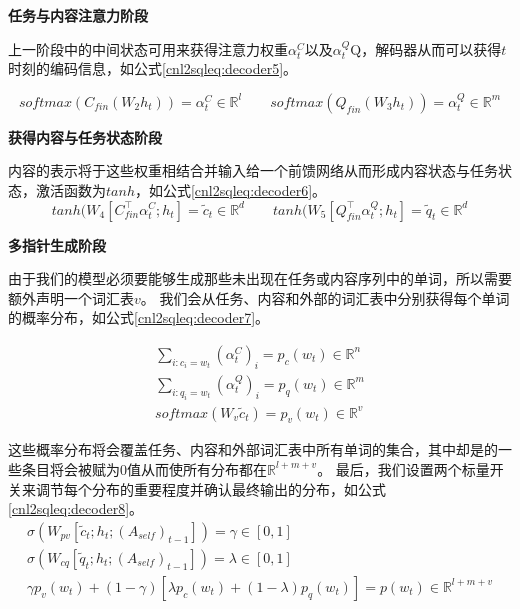 \textbf{任务与内容注意力阶段}

上一阶段中的中间状态可用来获得注意力权重$\alpha^C_t$以及$\alpha^Q_t$Q，解码器从而可以获得$t$时刻的编码信息，如公式\ref{cnl2sqleq:decoder5}。

\begin{equation}
  \label{cnl2sqleq:decoder5}
  softmax(C_{fin}(W_2 h_t)) = \alpha^C_t \in \mathbb{R}^{l} \qquad softmax(Q_{fin}(W_3 h_t)) = \alpha^Q_t \in \mathbb{R}^{m}
\end{equation}

\textbf{获得内容与任务状态阶段}

内容的表示将于这些权重相结合并输入给一个前馈网络从而形成内容状态与任务状态，激活函数为$tanh$，如公式\ref{cnl2sqleq:decoder6}。
\begin{equation}
  \label{cnl2sqleq:decoder6}
  tanh(W_4[C^{\top}_{fin}\alpha^C_t;h_t] = \widetilde{c}_{t} \in \mathbb{R}^{d} \qquad tanh(W_5[Q^{\top}_{fin}\alpha^Q_t;h_t] = \widetilde{q}_{t} \in \mathbb{R}^{d}
\end{equation}

\textbf{多指针生成阶段}

由于我们的模型必须要能够生成那些未出现在任务或内容序列中的单词，所以需要额外声明一个词汇表$v$。
我们会从任务、内容和外部的词汇表中分别获得每个单词的概率分布，如公式\ref{cnl2sqleq:decoder7}。

\begin{gather}
  \label{cnl2sqleq:decoder7}
  \sum_{i:c_i=w_t} (\alpha^C_t)_i = p_c(w_t) \in \mathbb{R}^{n}\\
  \sum_{i:q_i=w_t} (\alpha^Q_t)_i = p_q(w_t) \in \mathbb{R}^{m}\\
  softmax(W_v\widetilde{c}_t) = p_v(w_t) \in \mathbb{R}^{v}
\end{gather}

这些概率分布将会覆盖任务、内容和外部词汇表中所有单词的集合，其中却是的一些条目将会被赋为0值从而使所有分布都在$\mathbb{R}^{l+m+v}$。
最后，我们设置两个标量开关来调节每个分布的重要程度并确认最终输出的分布，如公式\ref{cnl2sqleq:decoder8}。
\begin{gather}
  \label{cnl2sqleq:decoder8}
  \sigma (W_{pv}[\widetilde{c}_t;h_t;(A_{self})_{t-1}]) = \gamma \in [0,1]\\
  \sigma (W_{cq}[\widetilde{q}_t;h_t;(A_{self})_{t-1}]) = \lambda \in [0,1]\\
  \gamma p_v(w_t) + (1 - \gamma)[\lambda p_c(w_t) + (1 - \lambda)p_q(w_t)] = p(w_t) \in \mathbb{R}^{l+m+v}
\end{gather}

